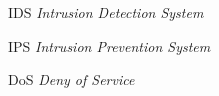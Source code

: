 \begin{siglas}
	\item[IDS] \textit{Intrusion Detection System}
	\item[IPS] \textit{Intrusion Prevention System}
	\item[DoS] \textit{Deny of Service}
\end{siglas}
